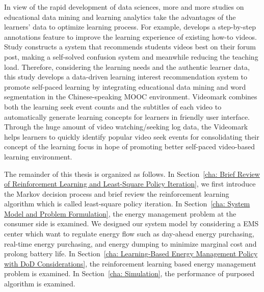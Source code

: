 In view of the rapid development of data sciences,
more and more studies on educational data mining and learning analytics take the advantages of the learners’ data to optimize learning process.
For example, \cite{kim2014} develops a step-by-step annotations feature to improve the learning experience of existing how-to videos.
Study \cite{agrawal2015} constructs a system that recommends students videos best on their forum post, making a self-solved confusion system and meanwhile reducing the teaching load.
Therefore, considering the learning needs and the authentic learner data,
this study develops a data-driven learning interest recommendation system to promote self-paced learning by integrating educational data mining and word segmentation in the Chinese-speaking MOOC environment.
Videomark combines both the learning seek event counts and the subtitles of each video to automatically generate learning concepts for learners in friendly user interface.
Through the huge amount of video watching/seeking log data, the Videomark helps learners to quickly identify popular video seek events for consolidating their concept of the learning focus in hope of promoting better self-paced video-based learning environment.

The remainder of this thesis is organized as follows.
In Section~\ref{cha: Brief Review of Reinforcement Learning and Least-Square Policy Iteration}, we first introduce the Markov decision process and brief review the reinforcement learning algorithm which is called least-square policy iteration.
In Section~\ref{cha: System Model and Problem Formulation}, the energy management problem at the consumer side is examined. We designed our system model by considering a EMS center which want to regulate energy flow such as day-ahead energy purchasing, real-time energy purchasing, and energy dumping to minimize marginal cost and prolong battery life.
In Section~\ref{cha: Learning-Based Energy Management Policy with DoD Considerations}, the reinforcement learning based energy management problem is examined.
In Section~\ref{cha: Simulation}, the performance of purposed algorithm is examined.
